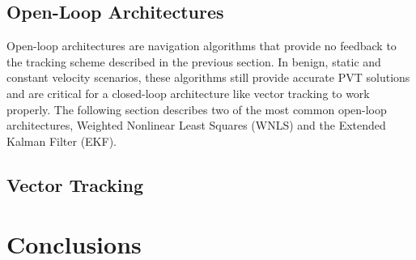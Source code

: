 \subsection{Open-Loop Architectures}
Open-loop architectures are navigation algorithms that provide no feedback to the tracking scheme described in the previous section. In benign, static and constant velocity scenarios, these algorithms still provide accurate PVT solutions and are critical for a closed-loop architecture like vector tracking to work properly. The following section describes two of the most common open-loop architectures, Weighted Nonlinear Least Squares (WNLS) and the Extended Kalman Filter (EKF).


\subsection{Vector Tracking}

\section{Conclusions}